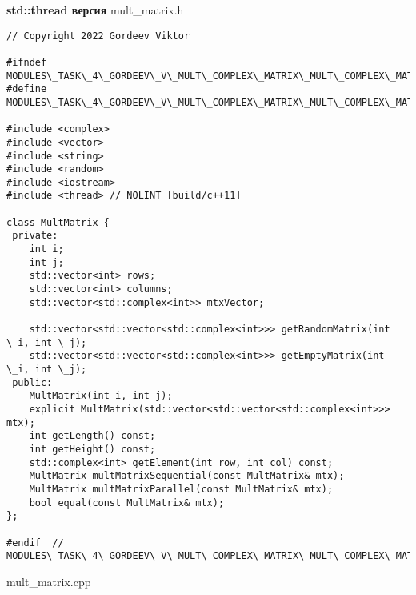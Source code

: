 \documentclass{report}
\begin{document}
\textbf{std::thread версия}
\newline
\newline mult\_matrix.h
\begin{lstlisting}
// Copyright 2022 Gordeev Viktor

#ifndef MODULES\_TASK\_4\_GORDEEV\_V\_MULT\_COMPLEX\_MATRIX\_MULT\_COMPLEX\_MATRIX\_H\_
#define MODULES\_TASK\_4\_GORDEEV\_V\_MULT\_COMPLEX\_MATRIX\_MULT\_COMPLEX\_MATRIX\_H\_

#include <complex>
#include <vector>
#include <string>
#include <random>
#include <iostream>
#include <thread> // NOLINT [build/c++11]

class MultMatrix {
 private:
    int i;
    int j;
    std::vector<int> rows;
    std::vector<int> columns;
    std::vector<std::complex<int>> mtxVector;

    std::vector<std::vector<std::complex<int>>> getRandomMatrix(int \_i, int \_j);
    std::vector<std::vector<std::complex<int>>> getEmptyMatrix(int \_i, int \_j);
 public:
    MultMatrix(int i, int j);
    explicit MultMatrix(std::vector<std::vector<std::complex<int>>> mtx);
    int getLength() const;
    int getHeight() const;
    std::complex<int> getElement(int row, int col) const;
    MultMatrix multMatrixSequential(const MultMatrix& mtx);
    MultMatrix multMatrixParallel(const MultMatrix& mtx);
    bool equal(const MultMatrix& mtx);
};

#endif  // MODULES\_TASK\_4\_GORDEEV\_V\_MULT\_COMPLEX\_MATRIX\_MULT\_COMPLEX\_MATRIX\_H\_

\end{lstlisting}
mult\_matrix.cpp
\end{document}

